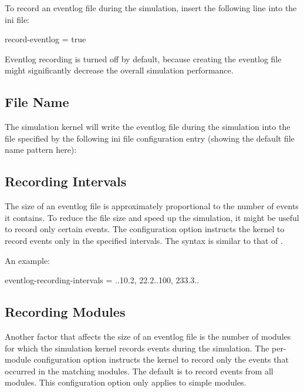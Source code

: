 To record an eventlog file during the simulation, insert the following line into
the ini file:

\begin{inifile}
record-eventlog = true
\end{inifile}

\begin{note}
    Eventlog recording is turned off by default, because creating the eventlog file
    might significantly decrease the overall simulation performance.
\end{note}

\subsection{File Name}
\label{sec:eventlog:file-name}

The simulation kernel will write the eventlog file during the simulation into the file
specified by the following ini file configuration entry (showing the default file name
pattern here):


\subsection{Recording Intervals}
\label{sec:eventlog:recording-intervals}

The size of an eventlog file is approximately proportional to the number of
events it contains. To reduce the file size and speed up the simulation, it
might be useful to record only certain events. The
 configuration option instructs the
kernel to record events only in the specified intervals. The syntax is
similar to that of .

An example:

\begin{inifile}
eventlog-recording-intervals = ..10.2, 22.2..100, 233.3..
\end{inifile}

\subsection{Recording Modules}
\label{sec:eventlog:recording-modules}

Another factor that affects the size of an eventlog file is the number of
modules for which the simulation kernel records events during the
simulation. The  per-module configuration
option instructs the kernel to record only the events that occurred in the
matching modules. The default is to record events from all modules. This
configuration option only applies to simple modules.


